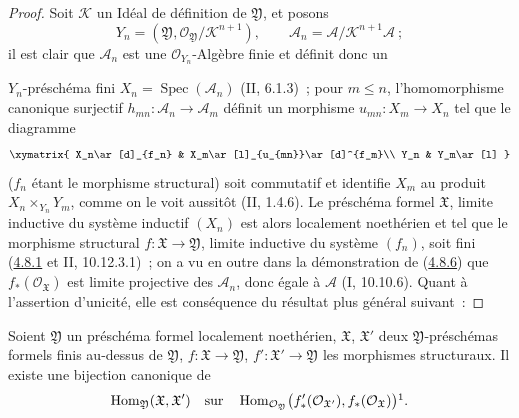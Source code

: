 \begin{proof}
Soit $\mathcal K$ un Idéal de définition de $\mathfrak Y$, et posons
\[
Y_n=(\mathfrak Y,\mathcal O_{\mathfrak Y}/\mathcal K^{n+1}),\qquad
\mathcal A_n=\mathcal A/\mathcal K^{n+1}\mathcal A~;
\]
il est clair que $\mathcal A_n$ est une $\mathcal O_{Y_n}$-Algèbre finie et
définit donc un


$Y_n$-préschéma fini $X_n=\operatorname{Spec}(\mathcal A_n)$ (II, 6.1.3)~;
pour $m\leq n$, l'homomorphisme canonique surjectif
$h_{mn}:\mathcal A_n\to\mathcal A_m$ définit un morphisme
$u_{mn}:X_m\to X_n$ tel que le diagramme
\[
\xymatrix{
X_n\ar[d]_{f_n} & X_m\ar[l]_{u_{mn}}\ar[d]^{f_m}\\
Y_n & Y_m\ar[l]
}
\]
($f_n$ étant le morphisme structural) soit commutatif et identifie $X_m$ au
produit $X_n\times_{Y_n}Y_m$, comme on le voit aussitôt (II, 1.4.6). Le
préschéma formel $\mathfrak X$, limite inductive du système inductif $(X_n)$
est alors localement noethérien et tel que le morphisme structural
$f:\mathfrak X\to\mathfrak Y$, limite inductive du système $(f_n)$, soit fini
(\hyperref[III.4.8.1-fr]{4.8.1} et II, 10.12.3.1)~; on a vu en outre dans la
démonstration de (\hyperref[III.4.8.6-fr]{4.8.6}) que
$f_*(\mathcal O_{\mathfrak X})$ est limite projective des $\mathcal A_n$, donc
égale à $\mathcal A$ (I, 10.10.6). Quant à l'assertion d'unicité, elle est
conséquence du résultat plus général suivant~:
\end{proof}

\begin{proposition}[4.8.8]
\label{III.4.8.8-fr}
Soient $\mathfrak Y$ un préschéma formel localement noethérien,
$\mathfrak X$, $\mathfrak X'$ deux $\mathfrak Y$-préschémas formels finis
au-dessus de $\mathfrak Y$, $f:\mathfrak X\to\mathfrak Y$,
$f':\mathfrak X'\to\mathfrak Y$ les morphismes structuraux. Il existe une
bijection canonique de
\[
\operatorname{Hom}_{\mathfrak Y}(\mathfrak X,\mathfrak X')
\quad\hbox{sur}\quad
\operatorname{Hom}_{\mathcal O_{\mathfrak Y}}
\bigl(f'_*(\mathcal O_{\mathfrak X'}),f_*(\mathcal O_{\mathfrak X})\bigr)
\footnotemark.
\]
\end{proposition}

